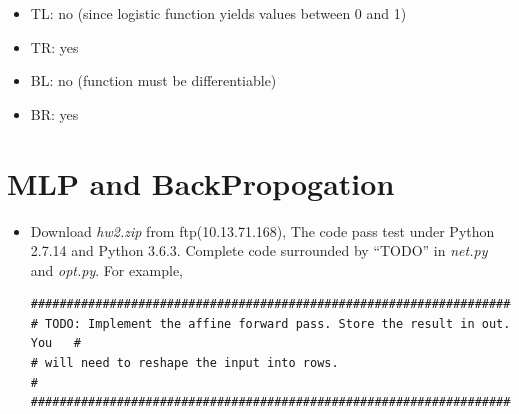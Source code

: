 \documentclass[12pt]{article}
\providecommand{\tightlist}{%
	\setlength{\itemsep}{0pt}\setlength{\parskip}{0pt}}
\begin{document}
\begin{itemize}
	\tightlist
	\item TL: no (since logistic function yields values between 0 and 1)
	\item TR: yes
	\item  BL: no (function must be differentiable)
	\item  BR: yes
\end{itemize}


\section{MLP and BackPropogation} \label{sec:3}

\begin{itemize}

	\item Download \textit{hw2.zip} from ftp(10.13.71.168), The code pass test under Python 2.7.14 and Python 3.6.3. Complete code surrounded by ``TODO'' in \textit{net.py} and \textit{opt.py}. For example,
	      \begin{verbatim}
###########################################################################
# TODO: Implement the affine forward pass. Store the result in out. You   #
# will need to reshape the input into rows.                               #
###########################################################################



\end{verbatim}
\end{itemize}
\end{document}
